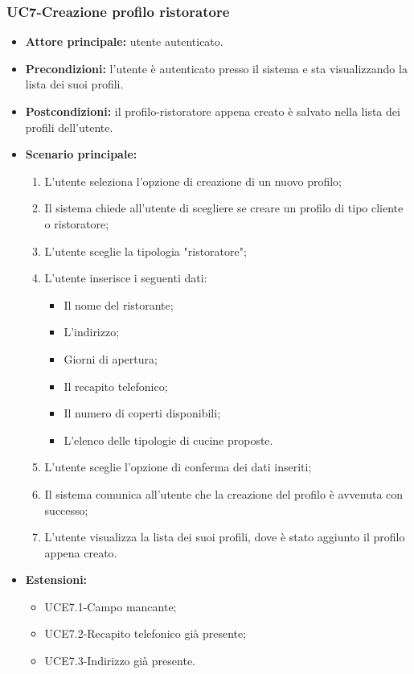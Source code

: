 \subsubsection{UC7-Creazione profilo ristoratore}
\begin{itemize}
    \item \textbf{Attore principale:} utente autenticato.
    \item \textbf{Precondizioni:} l'utente è autenticato presso il sistema e sta visualizzando la lista dei suoi profili.
    \item \textbf{Postcondizioni:} il profilo-ristoratore appena creato è salvato nella lista dei profili dell'utente.
    \item \textbf{Scenario principale:}
    \begin{enumerate}
        \item L'utente seleziona l'opzione di creazione di un nuovo profilo;
        \item Il sistema chiede all'utente di scegliere se creare un profilo di tipo cliente
        o ristoratore;
        \item L'utente sceglie la tipologia "ristoratore";
        \item L'utente inserisce i seguenti dati:
        \begin{itemize}
            \item Il nome del ristorante;
            \item L'indirizzo;
            \item Giorni di apertura;
            \item Il recapito telefonico;
            \item Il numero di coperti disponibili;
            \item L'elenco delle tipologie di cucine proposte.
        \end{itemize}
        \item L'utente sceglie l'opzione di conferma dei dati inseriti;
        \item Il sistema comunica all'utente che la creazione del profilo è avvenuta con successo;
        \item L'utente visualizza la lista dei suoi profili, dove è stato aggiunto il profilo appena creato.
    \end{enumerate}
        \item \textbf{Estensioni:}
        \begin{itemize}
                \item UCE7.1-Campo mancante;
                \item UCE7.2-Recapito telefonico già presente;
                \item UCE7.3-Indirizzo già presente.
        \end{itemize}
\end{itemize}

